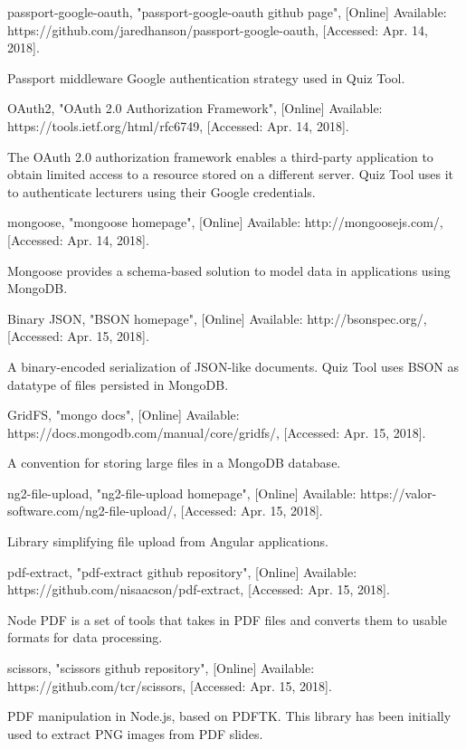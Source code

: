 \documentclass[11pt,a4paper]{report}
\begin{document}
\begin{thebibliography}{1}
 passport-google-oauth, "passport-google-oauth github page", [Online] Available: https://github.com/jaredhanson/passport-google-oauth, [Accessed: Apr. 14, 2018].

  Passport middleware Google authentication strategy used in Quiz Tool.

 OAuth2, "OAuth 2.0 Authorization Framework", [Online] Available: https://tools.ietf.org/html/rfc6749, [Accessed: Apr. 14, 2018].

  The OAuth 2.0 authorization framework enables a third-party application to obtain limited access to a resource stored on a
  different server. Quiz Tool uses it to authenticate lecturers using their Google credentials.

 mongoose, "mongoose homepage", [Online] Available: http://mongoosejs.com/, [Accessed: Apr. 14, 2018].

    Mongoose provides a schema-based solution to model data in applications using MongoDB.

 Binary JSON, "BSON homepage", [Online] Available: http://bsonspec.org/, [Accessed: Apr. 15, 2018].

    A binary-encoded serialization of JSON-like documents. Quiz Tool uses BSON as datatype of files persisted in MongoDB.

 GridFS, "mongo docs", [Online] Available: https://docs.mongodb.com/manual/core/gridfs/, [Accessed: Apr. 15, 2018].

    A convention for storing large files in a MongoDB database.

 ng2-file-upload, "ng2-file-upload homepage", [Online] Available: https://valor-software.com/ng2-file-upload/, [Accessed: Apr. 15, 2018].

    Library simplifying file upload from Angular applications.

 pdf-extract, "pdf-extract github repository", [Online] Available: https://github.com/nisaacson/pdf-extract, [Accessed: Apr. 15, 2018].

    Node PDF is a set of tools that takes in PDF files and converts them to usable formats for data processing.

 scissors, "scissors github repository", [Online] Available: https://github.com/tcr/scissors, [Accessed: Apr. 15, 2018].

    PDF manipulation in Node.js, based on PDFTK. This library has been initially used to extract PNG images from PDF slides.


\end{thebibliography}
\end{document}
